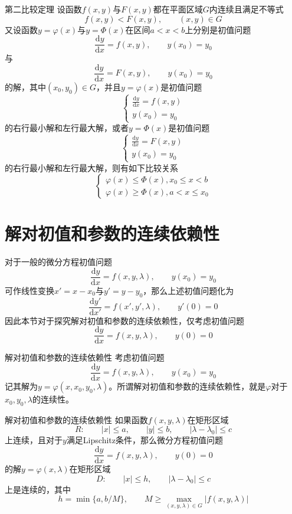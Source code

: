 \documentclass[lang = cn, scheme = chinese, thmcnt = section]{elegantbook}
\newcommand{\dd}{\mathrm{d}}           %
\begin{document}
\begin{theorem}{第二比较定理}
	设函数$f(x,y)$与$F(x,y)$都在平面区域$G$内连续且满足不等式
	$$
	f(x,y)<F(x,y),\qquad (x,y)\in G
	$$
	又设函数$y=\varphi(x)$与$y=\Phi(x)$在区间$a<x<b$上分别是初值问题
	$$
	\frac{\mathrm{d}y}{\mathrm{d}x}=f(x,y),\qquad 
	y(x_0)=y_0
	$$
	与
	$$
	\frac{\mathrm{d}y}{\mathrm{d}x}=F(x,y),\qquad 
	y(x_0)=y_0
	$$
	的解，其中$(x_0,y_0)\in G$，并且$y=\varphi(x)$是初值问题
	$$
	\begin{cases}
		\frac{\mathrm{d}y}{\mathrm{d}x}=f(x,y)\\
		y(x_0)=y_0
	\end{cases}
	$$
	的右行最小解和左行最大解，或者$y=\Phi(x)$是初值问题
	$$
	\begin{cases}
		\frac{\mathrm{d}y}{\mathrm{d}x}=F(x,y)\\
		y(x_0)=y_0
	\end{cases}
	$$
	的右行最小解和左行最大解，则有如下比较关系
	$$
	\begin{cases}
		\varphi(x)\le\Phi(x),x_0\le x<b\\
		\varphi(x)\ge\Phi(x),a<x\le x_0
	\end{cases}
	$$
\end{theorem}

\section{解对初值和参数的连续依赖性}

对于一般的微分方程初值问题
$$
\frac{\dd y}{\dd x}=f(x,y,\lambda),\qquad 
y(x_0)=y_0
$$
可作线性变换$x'=x-x_0$与$y'=y-y_0$，那么上述初值问题化为
$$
\frac{\dd y'}{\dd x'}=f(x',y',\lambda),\qquad 
y'(0)=0
$$
因此本节对于探究解对初值和参数的连续依赖性，仅考虑初值问题
$$
\frac{\dd y}{\dd x}=f(x,y,\lambda),\qquad 
y(0)=0
$$

\begin{definition}{解对初值和参数的连续依赖性}
	考虑初值问题%
	$$
	\frac{\dd y}{\dd x}=f(x,y,\lambda),\qquad 
	y(x_0)=y_0
	$$
	记其解为$y=\varphi(x,x_0,y_0,\lambda)$。所谓解对初值和参数的连续依赖性，就是$\varphi$对于$x_0,y_0,\lambda$的连续性。
\end{definition}

\begin{theorem}{解对初值和参数的连续依赖性}
	如果函数$f(x,y,\lambda)$在矩形区域%
	$$
	R:\qquad 
	|x|\le a,\qquad 
	|y|\le b,\qquad 
	|\lambda-\lambda_0|\le c
	$$
	上连续，且对于$y$满足Lipschitz条件，那么微分方程初值问题
	$$
	\frac{\dd y}{\dd x}=f(x,y,\lambda),\qquad 
	y(0)=0
	$$
	的解$y=\varphi(x,\lambda)$在矩形区域%
	$$
	D:\qquad 
	|x|\le h,\qquad 
	|\lambda-\lambda_0|\le c
	$$
	上是连续的，其中%
	$$
	h=\min\{ a,b/M \},\qquad 
	M\ge \max_{(x,y,\lambda)\in G}|f(x,y,\lambda)|
	$$
\end{theorem}
\end{document}
